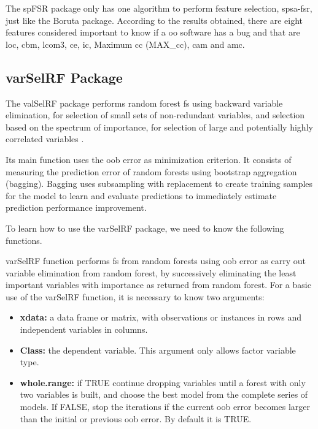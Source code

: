 The spFSR package only has one algorithm to perform feature selection, \acrshort{spsa-fsr}, just like the Boruta package. According to the results obtained, there are eight features considered important to know if a \acrshort{oo} software has a bug and that are \acrfull{loc}, \acrfull{cbm}, \acrfull{lcom3}, \acrfull{ce}, \acrfull{ic}, Maximum \acrlong{cc} (MAX\_\acrshort{cc}), \acrfull{cam} and \acrfull{amc}.

\subsection{varSelRF Package}
\label{sec:valselrf-package}

The valSelRF package performs random forest \acrshort{fs} using backward variable elimination, for selection of small sets of non-redundant variables, and selection based on the spectrum of importance, for selection of large and potentially highly correlated variables \cite{varselrf}.

Its main function uses the \acrfull{oob} error as minimization criterion. It consists of measuring the prediction error of random forests using bootstrap aggregation (bagging). Bagging uses subsampling with replacement to create training samples for the model to learn and evaluate predictions to immediately estimate prediction performance improvement.

To learn how to use the varSelRF package, we need to know the following functions.

varSelRF function performs \acrshort{fs} from random forests using \acrshort{oob} error as carry out variable elimination from random forest, by successively eliminating the least important variables with importance as returned from random forest. For a basic use of the varSelRF function, it is necessary to know two arguments:

\begin{itemize}
    \item \textbf{xdata:} a data frame or matrix, with observations or instances in rows and independent variables in columns.
    
    \item \textbf{Class:} the dependent variable. This argument only allows factor variable type.
    
    \item \textbf{whole.range:} if TRUE continue dropping variables until a forest with only two variables is built, and choose the best model from the complete series of models. If FALSE, stop the iterations if the current \acrshort{oob} error becomes larger than the initial or previous \acrshort{oob} error. By default it is TRUE.
\end{itemize}

